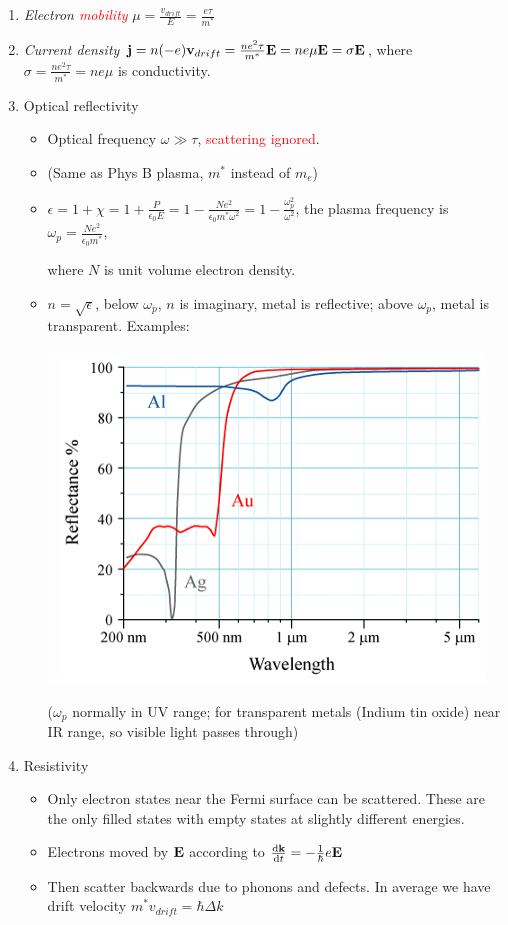 \documentclass{article}
\theoremstyle{remark}
\theoremstyle{remark}
\newcommand{\where}[1]{\begin{flushright}where #1.\end{flushright}}
\begin{document}
\begin{enumerate}
    \item \textit{Electron \textcolor{red}{mobility}} $\boxed{\mu=\frac{v_{drift}}{E}=\frac{e\tau}{m^*}}$
    \item \textit{Current density} $\vb{j}=n(-e)\vb{v}_{drift}=\frac{ne^2\tau}{m^*}\vb{E}=ne\mu\vb{E}=\sigma\vb{E}$, where $\boxed{\sigma=\frac{ne^2\tau}{m^*}=ne\mu}$ is conductivity.
    \item Optical reflectivity\begin{itemize}
        \item Optical frequency $\omega\gg\tau$, \textcolor{red}{scattering ignored}.
        \item (Same as Phys B plasma, $m^*$ instead of $m_e$)
        \item $\epsilon=1+\chi=1+\frac{P}{\epsilon_0E}=1-\frac{Ne^2}{\epsilon_0 m^*\omega^2}=1-\frac{\omega_p^2}{\omega^2}$, the plasma frequency is $\omega_p=\frac{Ne^2}{\epsilon_0m^*}$, \where{$N$ is unit volume electron density}
        \item $n=\sqrt{\epsilon}$, below $\omega_p$, $n$ is imaginary, metal is reflective; above $\omega_p$, metal is transparent. Examples:
            \begin{center}
                \includegraphics*[width=0.4\linewidth]{cmp_metal_reflectivity.png}
            \end{center}
            ($\omega_p$ normally in UV range; for transparent metals (Indium tin oxide) near IR range, so visible light passes through)
        \end{itemize}
    \item Resistivity\begin{itemize}
            \item Only electron states near the Fermi surface can be scattered. These are the only filled states with empty states at slightly different energies.
            \item Electrons moved by $\vb{E}$ according to $\dv{\vb{k}}{t}=-\frac{1}{\hbar}e\vb{E}$
            \item Then scatter backwards due to phonons and defects. In average we have drift velocity $m^*v_{drift}=\hbar\Delta k$

\end{itemize}
\end{enumerate}
\end{document}
